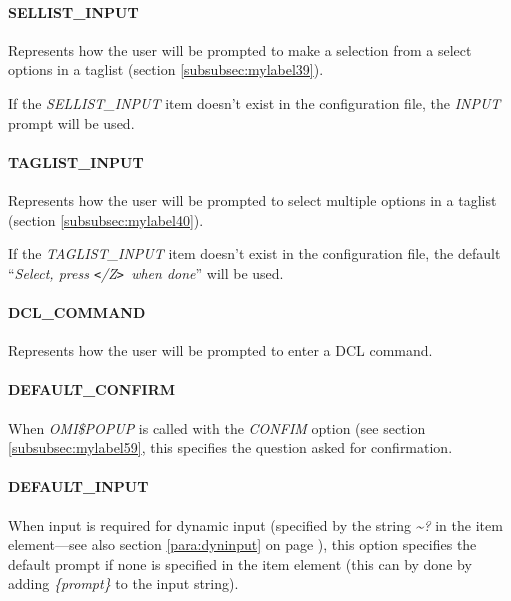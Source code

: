 \documentclass[a4paper]{book}
\newcommand{\lt}{\texttt{<}}
\newcommand{\gt}{\texttt{>}}
\begin{document}
\paragraph{SELLIST{\_}INPUT}
\label{para:sellistinput}

Represents how the user will be prompted to make a selection from a select options in a taglist (section \ref{subsubsec:mylabel39}).

If the \textsl{SELLIST{\_}INPUT} item doesn't exist in the configuration file, the \textsl{INPUT} prompt will be used.

\paragraph{TAGLIST{\_}INPUT}
\label{para:taglistinput}

Represents how the user will be prompted to select multiple options in a taglist (section \ref{subsubsec:mylabel40}).

If the \textsl{TAGLIST{\_}INPUT} item doesn't exist in the configuration file, the default ``\textsl{Select, press \lt\Ctrl/Z\gt\ when done}'' will be used.


\paragraph{DCL{\_}COMMAND}

Represents how the user will be prompted to enter a DCL command.

\paragraph{DEFAULT{\_}CONFIRM}\label{para:defconfirm}

When \textsl{OMI{\$}POPUP} is called with the \textsl{CONFIM} option (see section \ref{subsubsec:mylabel59}, this specifies the question asked for confirmation.

\paragraph{DEFAULT{\_}INPUT}

When input is required for dynamic input (specified by the string \textsl{\~{}?} in the item 
element---see also section \ref{para:dyninput} on page \pageref{para:dyninput}),
this option specifies the default prompt if none is specified in 
the item element (this can by done by adding \textsl{{\{}\textit{prompt}{\}}} to the input string).
\end{document}
